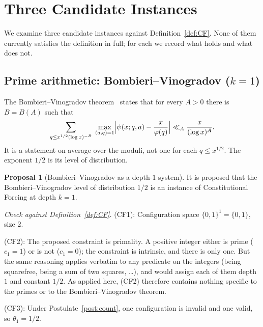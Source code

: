 \documentclass[12pt]{amsart}
\theoremstyle{plain}
\theoremstyle{definition}
\newtheorem{proposal}[theorem]{Proposal}
\theoremstyle{remark}
\begin{document}
\section{Three Candidate Instances}
\label{sec:instances}

We examine three candidate instances against Definition~\ref{def:CF}. None of
them currently satisfies the definition in full; for each we record what holds
and what does not.

\subsection{Prime arithmetic: Bombieri--Vinogradov ($k = 1$)}
\label{sec:BV}

The Bombieri--Vinogradov theorem~\cite{Bombieri1965,Vinogradov1965} states
that for every $A > 0$ there is $B = B(A)$ such that
\[
  \sum_{q \leq x^{1/2}(\log x)^{-B}} \; \max_{(a,q) = 1}
  \Bigl| \psi(x;q,a) - \frac{x}{\varphi(q)} \Bigr|
  \ll_A \frac{x}{(\log x)^A}.
\]
It is a statement on average over the moduli, not one for each
$q \leq x^{1/2}$. The exponent $1/2$ is its level of distribution.

\begin{proposal}[Bombieri--Vinogradov as a depth-$1$ system]
\label{prop:BV}
It is proposed that the Bombieri--Vinogradov level of distribution $1/2$ is an
instance of Constitutional Forcing at depth $k = 1$.
\end{proposal}

\noindent\emph{Check against Definition~\ref{def:CF}.}
(CF1): Configuration space $\{0,1\}^1 = \{0,1\}$, size $2$.

(CF2): The proposed constraint is primality. A positive integer either is
prime ($c_1 = 1$) or is not ($c_1 = 0$); the constraint is intrinsic, and there
is only one. But the same reasoning applies verbatim to any predicate on the
integers (being squarefree, being a sum of two squares, \ldots), and would
assign each of them depth $1$ and constant $1/2$. As applied here, (CF2)
therefore contains nothing specific to the primes or to the
Bombieri--Vinogradov theorem.

(CF3): Under Postulate~\ref{post:count}, one configuration is invalid and one
valid, so $\theta_1 = 1/2$.
\end{document}
